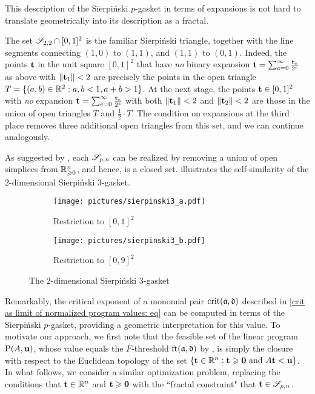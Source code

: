 \documentclass[11pt]{amsart}
\begin{document}
This description of the Sierpi\'nski $p$-gasket in terms of expansions is not hard to translate geometrically into its description as a fractal.

\begin{example}
\label{sierpinski triangle: E}
The set $\mathscr{S}_{2,2} \cap [0,1]^2$ is the familiar Sierpi\'nski triangle, together with the line segments connecting $(1,0)$ to $(1,1)$, and $(1,1)$ to $(0,1)$.
Indeed, the points $\mathbf{t}$ in the unit square $[0,1]^2$ that have \emph{no} binary expansion $\mathbf{t} = \sum_{e=0}^{\infty}\frac{\mathbf{t}_e}{2^e}$ as above with $\| \mathbf{t}_1 \| < 2$ are precisely the points in the open triangle  $T = \{ (a,b) \in \mathbb{R}^2 : a,b < 1, a+b > 1 \}$.
At the next stage, the points $\mathbf{t} \in [0,1]^2$ with \emph{no} expansion $\mathbf{t} = \sum_{e=0}^{\infty}\frac{\mathbf{t}_e}{2^e}$ with both  $\| \mathbf{t}_1 \| < 2$ and $\| \mathbf{t}_2 \| < 2$ are those in the union of open triangles $T$ and $\frac{1}{2} \cdot T$.  The condition on expansions at the third place removes three additional open triangles from this set, and we can continue analogously.
\end{example}


As suggested by , each $\mathscr{S}_{p,n}$  can be realized by removing a union of open simplices from $\mathbb{R}_{\geqslant 0}^n$, and hence, is a closed set.  
 illustrates the self-similarity of the $2$-dimensional Sierpi\'nski $3$-gasket.

\begin{figure}
\begin{subfigure}{.49\textwidth}
  \centering
  \texttt{[image: pictures/sierpinski3\_a.pdf]}
  \caption{Restriction to $[0,1]^2$}
\end{subfigure}
\begin{subfigure}{.49\textwidth}
  \centering
  \texttt{[image: pictures/sierpinski3\_b.pdf]}
  \caption{Restriction to $[0,9]^2$}
\end{subfigure}
\caption{The $2$-dimensional Sierpi\'nski 3-gasket}
\label{fig: sierpinski 3-gasket}
\end{figure}


Remarkably, the critical exponent of a monomial pair $\operatorname{crit}(\mathfrak{a}, \mathfrak{d})$ described in \eqref{crit as limit of normalized program values: eq} can be computed in terms of the Sierpi\'nski $p$-gasket, providing a geometric interpretation for this value.  To motivate our approach, we first note that the feasible set of the linear program $\mathrm{P}(A, \mathbf{u})$, whose value equals the $F$-threshold $\operatorname{ft}(\mathfrak{a}, \mathfrak{d})$ by , is simply the closure with respect to the Euclidean topology of the set $\{ \mathbf{t} \in \mathbb{R}^n : \mathbf{t} \geqslant \mathbf{0} \text{ and } A\mathbf{t} < \mathbf{u} \}$.  In what follows, we consider a similar optimization problem,  replacing the conditions that $\mathbf{t} \in \mathbb{R}^n$ and $\mathbf{t} \geqslant \mathbf{0}$ with the ``fractal constraint" that $\mathbf{t} \in \mathscr{S}_{p,n}$.
\end{document}
